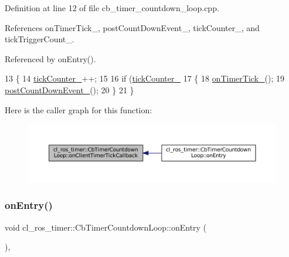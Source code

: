 Definition at line 12 of file cb\+\_\+timer\+\_\+countdown\+\_\+loop.\+cpp.



References on\+Timer\+Tick\+\_\+, post\+Count\+Down\+Event\+\_\+, tick\+Counter\+\_\+, and tick\+Trigger\+Count\+\_\+.



Referenced by on\+Entry().


\begin{DoxyCode}
13 \{
14     \hyperlink{classcl__ros__timer_1_1CbTimerCountdownLoop_a2b2d192bae0da3d26c6e3011583f9a6a}{tickCounter\_}++;
15 
16     \textcolor{keywordflow}{if} (\hyperlink{classcl__ros__timer_1_1CbTimerCountdownLoop_a2b2d192bae0da3d26c6e3011583f9a6a}{tickCounter\_} %
17     \{
18         \hyperlink{classcl__ros__timer_1_1CbTimerCountdownLoop_a9df6547f8ddf45107d8850d8a1a92cf4}{onTimerTick\_}();
19         \hyperlink{classcl__ros__timer_1_1CbTimerCountdownLoop_aafc2594c2923e4a355394ffb339d1800}{postCountDownEvent\_}();
20     \}
21 \}
\end{DoxyCode}
Here is the caller graph for this function\+:
\nopagebreak
\begin{figure}[H]
\begin{center}
\leavevmode
\includegraphics[width=350pt]{classcl__ros__timer_1_1CbTimerCountdownLoop_acb16f3448ad5955bf36e7c2cfd9f691c_icgraph}
\end{center}
\end{figure}
\mbox{\label{classcl__ros__timer_1_1CbTimerCountdownLoop_aa088f15db4fb2c307c86b30b2e1f7744}} 
\subsubsection{\texorpdfstring{on\+Entry()}{onEntry()}}
{\footnotesize\ttfamily void cl\+\_\+ros\+\_\+timer\+::\+Cb\+Timer\+Countdown\+Loop\+::on\+Entry (\begin{DoxyParamCaption}{ }\end{DoxyParamCaption})\hspace{0.3cm}{\ttfamily [override]}, {\ttfamily [virtual]}}




